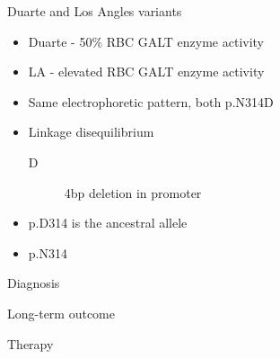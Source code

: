 \documentclass[presentation, smaller]{beamer}
\begin{document}
\begin{frame}[label={sec:orgheadline7}]{Duarte and Los Angles variants}
\begin{itemize}
\item Duarte - 50\% RBC GALT enzyme activity
\item LA - elevated RBC GALT enzyme activity
\item Same electrophoretic pattern, both p.N314D
\item Linkage disequilibrium
\begin{description}
\item[{D}] 4bp deletion in promoter
\end{description}
\item p.D314 is the ancestral allele
\item p.N314
\end{itemize}
\end{frame}


\begin{frame}[label={sec:orgheadline8}]{Diagnosis}
\end{frame}
\begin{frame}[label={sec:orgheadline9}]{Long-term outcome}
\end{frame}

\begin{frame}[label={sec:orgheadline10}]{Therapy}
\end{frame}
\end{document}

